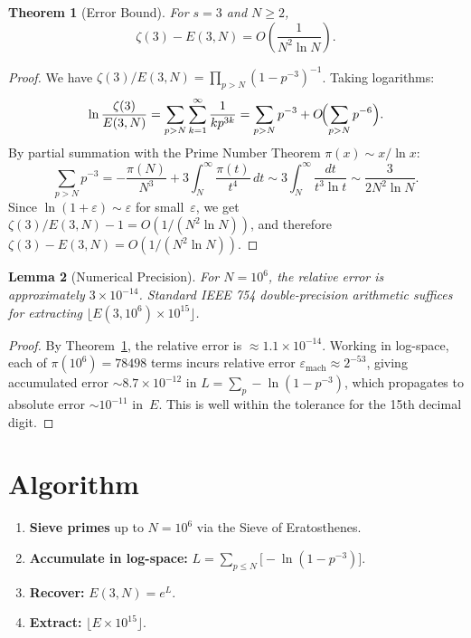 \documentclass[11pt]{article}
\newtheorem{theorem}{Theorem}
\newtheorem{lemma}[theorem]{Lemma}
\begin{document}
\begin{theorem}[Error Bound]
\label{thm:error}
For $s = 3$ and $N \ge 2$,
\[
\zeta(3) - E(3, N) = O\!\left(\frac{1}{N^2 \ln N}\right).
\]
\end{theorem}

\begin{proof}
We have $\zeta(3)/E(3,N) = \prod_{p>N}(1-p^{-3})^{-1}$. Taking logarithms:
\[
\ln\frac{\zeta(3)}{E(3,N)} = \sum_{p>N} \sum_{k=1}^{\infty} \frac{1}{kp^{3k}} = \sum_{p>N} p^{-3} + O\!\Bigl(\sum_{p>N} p^{-6}\Bigr).
\]
By partial summation with the Prime Number Theorem $\pi(x) \sim x/\ln x$:
\[
\sum_{p>N} p^{-3} = -\frac{\pi(N)}{N^3} + 3\int_N^{\infty} \frac{\pi(t)}{t^4}\,dt \sim 3\int_N^{\infty} \frac{dt}{t^3 \ln t} \sim \frac{3}{2N^2 \ln N}.
\]
Since $\ln(1+\varepsilon) \sim \varepsilon$ for small~$\varepsilon$, we get $\zeta(3)/E(3,N)-1 = O(1/(N^2\ln N))$, and therefore $\zeta(3) - E(3,N) = O(1/(N^2\ln N))$.
\end{proof}

\begin{lemma}[Numerical Precision]
For $N = 10^6$, the relative error is approximately $3 \times 10^{-14}$. Standard IEEE 754 double-precision arithmetic suffices for extracting $\lfloor E(3,10^6) \times 10^{15} \rfloor$.
\end{lemma}

\begin{proof}
By Theorem~\ref{thm:error}, the relative error is $\approx 1.1 \times 10^{-14}$. Working in log-space, each of $\pi(10^6) = 78498$ terms incurs relative error $\varepsilon_{\mathrm{mach}} \approx 2^{-53}$, giving accumulated error $\sim 8.7 \times 10^{-12}$ in $L = \sum_p -\ln(1-p^{-3})$, which propagates to absolute error $\sim 10^{-11}$ in~$E$. This is well within the tolerance for the 15th decimal digit.
\end{proof}

\section{Algorithm}

\begin{enumerate}
\item \textbf{Sieve primes} up to $N = 10^6$ via the Sieve of Eratosthenes.
\item \textbf{Accumulate in log-space:} $L = \sum_{p \le N} \bigl[-\ln(1-p^{-3})\bigr]$.
\item \textbf{Recover:} $E(3, N) = e^L$.
\item \textbf{Extract:} $\lfloor E \times 10^{15} \rfloor$.
\end{enumerate}
\end{document}
